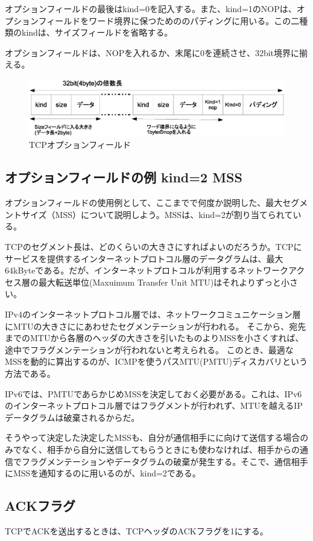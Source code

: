 オプションフィールドの最後はkind=0を記入する。また、kind=1のNOPは、オプションフィールドをワード境界に保つためののパディングに用いる。この二種類のkindは、サイズフィールドを省略する。

オプションフィールドは、NOPを入れるか、末尾に0を連続させ、32bit境界に揃える。

\begin{figure}[htbp]
	\includegraphics[width=12cm,clip]{draw/tcpopt.eps}
	\caption{TCPオプションフィールド}
	\label{fig:tcpopt}
\end{figure}


\subsection{オプションフィールドの例 kind=2 MSS}
オプションフィールドの使用例として、ここまでで何度か説明した、最大セグメントサイズ（MSS）について説明しよう。MSSは、kind=2が割り当てられている。

TCPのセグメント長は、どのくらいの大きさにすればよいのだろうか。TCPにサービスを提供するインターネットプロトコル層のデータグラムは、最大64kByteである。だが、インターネットプロトコルが利用するネットワークアクセス層の最大転送単位(Maxuimum Transfer Unit MTU)はそれよりずっと小さい。

IPv4のインターネットプロトコル層では、ネットワークコミュニケーション層にMTUの大きさににあわせたセグメンテーションが行われる。
そこから、宛先までのMTUから各層のヘッダの大きさを引いたものよりMSSを小さくすれば、途中でフラグメンテーションが行われないと考えられる。
このとき、最適なMSSを動的に算出するのが、ICMPを使うパスMTU(PMTU)ディスカバリという方法である。

IPv6では、PMTUであらかじめMSSを決定しておく必要がある。これは、IPv6のインターネットプロトコル層ではフラグメントが行われず、MTUを越えるIPデータグラムは破棄されるからだ。

そうやって決定した決定したMSSも、自分が通信相手にに向けて送信する場合のみでなく、相手から自分に送信してもらうときにも使わなければ、相手からの通信でフラグメンテーションやデータグラムの破棄が発生する。そこで、通信相手にMSSを通知するのに用いるのが、kind=2である。

\subsection{ACKフラグ}
TCPでACKを送出するときは、TCPヘッダのACKフラグを1にする。

